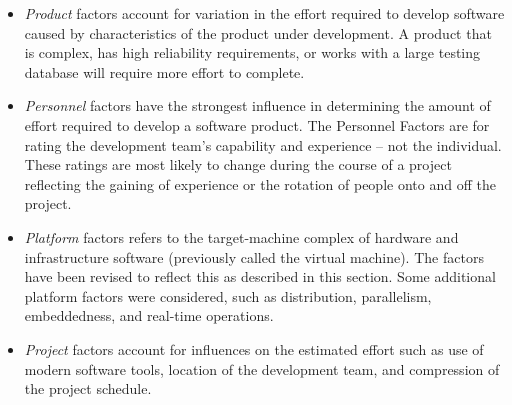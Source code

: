 \begin{itemize}
\item \emph{Product} factors account for variation in the effort required
to develop software caused by characteristics of the product under
development. A product that is complex, has high reliability requirements,
or works with a large testing database will require more effort to
complete.

\item \emph{Personnel} factors have the strongest influence in determining
the amount of effort required to develop a software product. The Personnel
Factors are for rating the development team’s capability and experience
– not the individual. These ratings are most likely to change during
the course of a project reflecting the gaining of experience or the
rotation of people onto and off the project. 

\item \emph{Platform} factors refers to the target-machine complex of hardware
and infrastructure software (previously called the virtual machine).
The factors have been revised to reflect this as described in this
section. Some additional platform factors were considered, such as
distribution, parallelism, embeddedness, and real-time operations. 

\item \emph{Project} factors account for influences on the estimated effort
such as use of modern software tools, location of the development
team, and compression of the project schedule. 


\end{itemize}
